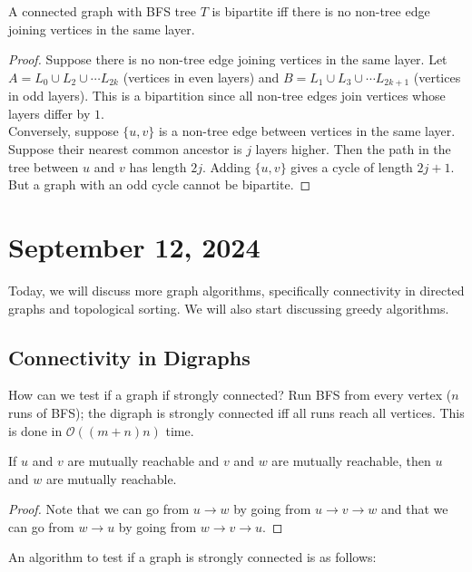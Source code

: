 \documentclass[12pt]{scrartcl}
\begin{document}
\begin{theorem}
    A connected graph with BFS tree $T$ is bipartite iff there is no non-tree edge joining vertices in the same layer.
\end{theorem}

\begin{proof}
    Suppose there is no non-tree edge joining vertices in the same layer. Let $A = L_0 \cup L_2 \cup \cdots L_{2k}$ (vertices in even layers) and $B = L_1 \cup L_3 \cup \cdots L_{2k+1}$ (vertices in odd layers). This is a bipartition since all non-tree edges join vertices whose layers differ by $1$. \\

    Conversely, suppose $\{u, v\}$ is a non-tree edge between vertices in the same layer.  Suppose their nearest common ancestor is $j$ layers higher. Then the path in the tree between $u$ and $v$ has length $2j$. Adding $\{u, v\}$ gives a cycle of length $2j+1$. But a graph with an odd cycle cannot be bipartite.
\end{proof}

\section{September 12, 2024}

Today, we will discuss more graph algorithms, specifically connectivity in directed graphs and topological sorting. We will also start discussing greedy algorithms.

\subsection{Connectivity in Digraphs}

How can we test if a graph if strongly connected? Run BFS from every vertex ($n$ runs of BFS); the digraph is strongly connected iff all runs reach all vertices. This is done in $\mathcal{O}((m+n)n)$ time.

\begin{lemma}
    If $u$ and $v$ are mutually reachable and $v$ and $w$ are mutually reachable, then $u$ and $w$ are mutually reachable.
\end{lemma}

\begin{proof}
    Note that we can go from $u\to w$ by going from $u\to v\to w$ and that we can go from $w\to u$ by going from $w\to v \to u$.
\end{proof}

An algorithm to test if a graph is strongly connected is as follows: 
\end{document}

